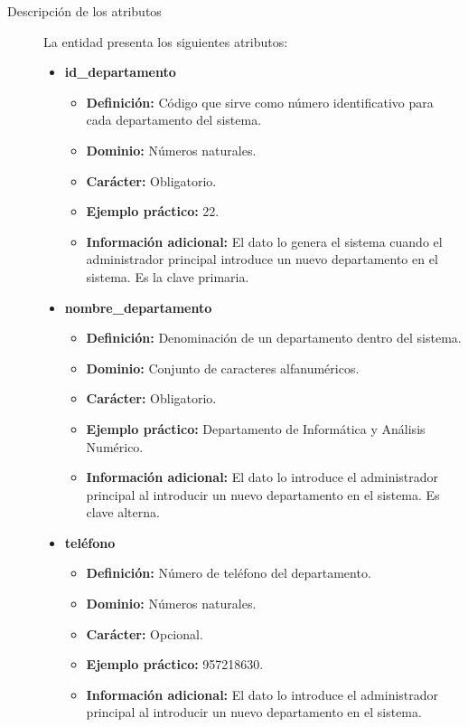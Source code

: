 \begin{description}
   \item[Descripción de los atributos] La entidad presenta los siguientes
   atributos:

   \begin{itemize}
    \item \textbf{id\_departamento}
      \begin{itemize}
         \item \textbf{Definición:} Código que sirve como número identificativo
               para cada departamento del sistema.
         \item \textbf{Dominio:} Números naturales.
         \item \textbf{Carácter:} Obligatorio.
         \item \textbf{Ejemplo práctico:} 22.
         \item \textbf{Información adicional:} El dato lo genera el sistema
               cuando el administrador principal introduce un nuevo departamento
               en el sistema. Es la clave primaria.
      \end{itemize}
   \item \textbf{nombre\_departamento}
      \begin{itemize}
         \item \textbf{Definición:} Denominación de un departamento dentro del sistema.
         \item \textbf{Dominio:} Conjunto de caracteres alfanuméricos.
         \item \textbf{Carácter:} Obligatorio.
         \item \textbf{Ejemplo práctico:} Departamento de Informática y Análisis Numérico.
         \item \textbf{Información adicional:} El dato lo introduce el
         administrador principal al introducir un nuevo departamento en el sistema. Es
         clave alterna.
      \end{itemize}
   \item \textbf{teléfono}
      \begin{itemize}
         \item \textbf{Definición:} Número de teléfono del departamento.
         \item \textbf{Dominio:} Números naturales.
         \item \textbf{Carácter:} Opcional.
         \item \textbf{Ejemplo práctico:} 957218630.
         \item \textbf{Información adicional:} El dato lo introduce el
         administrador principal al introducir un nuevo departamento en el sistema.
      \end{itemize}
   \end{itemize}


\end{description}
